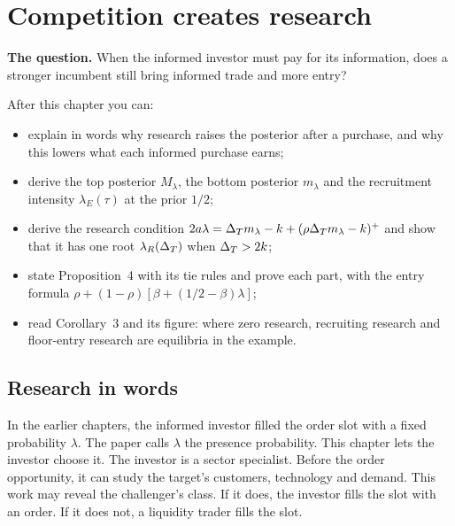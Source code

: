 \chapter{Competition creates research}\label{ch:research}

\begin{chapterplan}
\textbf{The question.} When the informed investor must pay for its information, does a stronger incumbent still
bring informed trade and more entry?

After this chapter you can:
\begin{itemize}
\item explain in words why research raises the posterior after a purchase, and why this lowers what each informed
purchase earns;
\item derive the top posterior \(M_\lambda\), the bottom posterior \(m_\lambda\) and the recruitment intensity
\(\lambda_E(\tau)\) at the prior \(1/2\);
\item derive the research condition \(2a\lambda=\Delta_T m_\lambda-k+(\rho\Delta_T m_\lambda-k)^+\) and show that it has one
root \(\lambda_R(\Delta_T)\) when \(\Delta_T>2k\);
\item state Proposition~4 with its tie rules and prove each part, with the entry formula
\(\rho+(1-\rho)[\beta+(1/2-\beta)\lambda]\);
\item read Corollary~3 and its figure: where zero research, recruiting research and floor-entry research are
equilibria in the example.
\end{itemize}
\end{chapterplan}

\section{Research in words}\label{sec:research-words}

In the earlier chapters, the informed investor filled the order slot with a fixed probability \(\lambda\). The paper
calls \(\lambda\) the presence probability. This chapter lets the investor choose it. The investor is a sector
specialist. Before the order opportunity, it can study the target's customers, technology and demand. This work may
reveal the challenger's class. If it does, the investor fills the slot with an order. If it does not, a liquidity
trader fills the slot.

